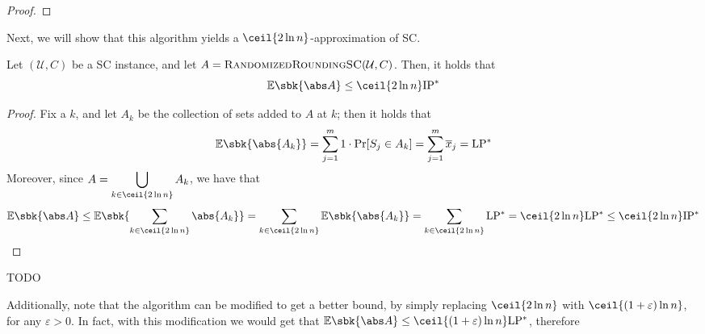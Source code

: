 \documentclass[a4paper, 12pt]{report}
\begin{document}
\begin{proof}
    \end{proof}

    Next, we will show that this algorithm yields  a $\ceil{2 \ln n}$-approximation of SC.

    \begin{framedlem}{}
        Let $(\mathcal U, C)$ be a SC instance, and let $A = \textsc{RandomizedRoundingSC}(\mathcal U, C)$. Then, it holds that $$\mathbb E \sbk{\abs A} \le \ceil{2 \ln n} \mathrm{IP}^*$$
    \end{framedlem}

    \begin{proof}
        Fix a  $k$, and let $A_k$ be the collection of sets added to $A$ at  $k$; then it holds that $$\mathbb E \sbk{\abs{A_k}} = \sum_{j = 1}^m {1 \cdot \Pr[S_j \in A_k]} = \sum_{j = 1}^m{\overline x_j} = \mathrm{LP^*}$$ Moreover, since $\displaystyle A = \bigcup_{k \in \ceil{2 \ln n}}{A_k}$, we have that $$\mathbb E \sbk{\abs A} \le \mathbb E \sbk{\sum_{k \in \ceil{2 \ln n}}{\abs{A_k}}} = \sum_{k \in \ceil {2 \ln n}}{\mathbb E \sbk{\abs{A_k}}} = \sum_{k \in \ceil{2 \ln n}}{\mathrm{LP^*}} = \ceil{2 \ln n} \mathrm{LP^*} \le \ceil{2 \ln n} \mathrm{IP^*}$$
    \end{proof}

    TODO 

    Additionally, note that the algorithm can be modified to get a better bound, by simply replacing $\ceil{2 \ln n}$ with $\ceil{(1 + \varepsilon) \ln n}$, for any $\varepsilon > 0$. In fact, with this modification we would get that $\mathbb E \sbk{\abs A} \le \ceil{(1 + \varepsilon) \ln n} \mathrm{LP^*}$, therefore 
\end{document}
